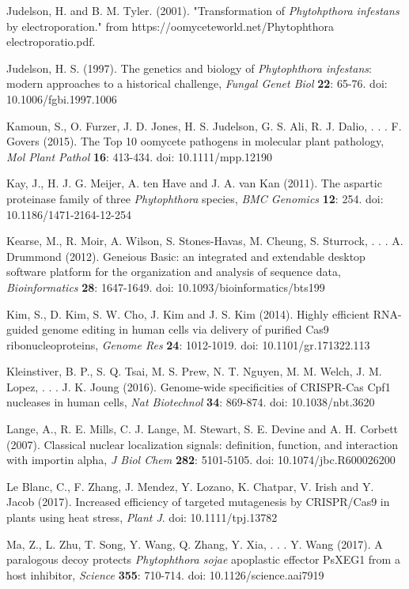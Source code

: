 \documentclass[onecolumn, 11pt,openany]{memoir}
\begin{document}
\begin{multicols}{2}
\begin{sloppy}
\begin{footnotesize}
Judelson, H. and B. M. Tyler. (2001). "Transformation of \textit{Phytohpthora infestans }by electroporation." from https://oomyceteworld.net/Phytophthora electroporatio.pdf.

Judelson, H. S. (1997). The genetics and biology of \textit{Phytophthora infestans}: modern approaches to a historical challenge, \textit{Fungal Genet Biol} \textbf{22}: 65-76. doi: 10.1006/fgbi.1997.1006

Kamoun, S., O. Furzer, J. D. Jones, H. S. Judelson, G. S. Ali, R. J. Dalio, . . . F. Govers (2015). The Top 10 oomycete pathogens in molecular plant pathology, \textit{Mol Plant Pathol} \textbf{16}: 413-434. doi: 10.1111/mpp.12190

Kay, J., H. J. G. Meijer, A. ten Have and J. A. van Kan (2011). The aspartic proteinase family of three \textit{Phytophthora }species, \textit{BMC Genomics} \textbf{12}: 254. doi: 10.1186/1471-2164-12-254

Kearse, M., R. Moir, A. Wilson, S. Stones-Havas, M. Cheung, S. Sturrock, . . . A. Drummond (2012). Geneious Basic: an integrated and extendable desktop software platform for the organization and analysis of sequence data, \textit{Bioinformatics} \textbf{28}: 1647-1649. doi: 10.1093/bioinformatics/bts199

Kim, S., D. Kim, S. W. Cho, J. Kim and J. S. Kim (2014). Highly efficient RNA-guided genome editing in human cells via delivery of purified Cas9 ribonucleoproteins, \textit{Genome Res} \textbf{24}: 1012-1019. doi: 10.1101/gr.171322.113

Kleinstiver, B. P., S. Q. Tsai, M. S. Prew, N. T. Nguyen, M. M. Welch, J. M. Lopez, . . . J. K. Joung (2016). Genome-wide specificities of CRISPR-Cas Cpf1 nucleases in human cells, \textit{Nat Biotechnol} \textbf{34}: 869-874. doi: 10.1038/nbt.3620

Lange, A., R. E. Mills, C. J. Lange, M. Stewart, S. E. Devine and A. H. Corbett (2007). Classical nuclear localization signals: definition, function, and interaction with importin alpha, \textit{J Biol Chem} \textbf{282}: 5101-5105. doi: 10.1074/jbc.R600026200

Le Blanc, C., F. Zhang, J. Mendez, Y. Lozano, K. Chatpar, V. Irish and Y. Jacob (2017). Increased efficiency of targeted mutagenesis by CRISPR/Cas9 in plants using heat stress, \textit{Plant J}. doi: 10.1111/tpj.13782

Ma, Z., L. Zhu, T. Song, Y. Wang, Q. Zhang, Y. Xia, . . . Y. Wang (2017). A paralogous decoy protects \textit{Phytophthora sojae} apoplastic effector PsXEG1 from a host inhibitor, \textit{Science} \textbf{355}: 710-714. doi: 10.1126/science.aai7919


\end{footnotesize}
\end{sloppy}
\end{multicols}
\end{document}
